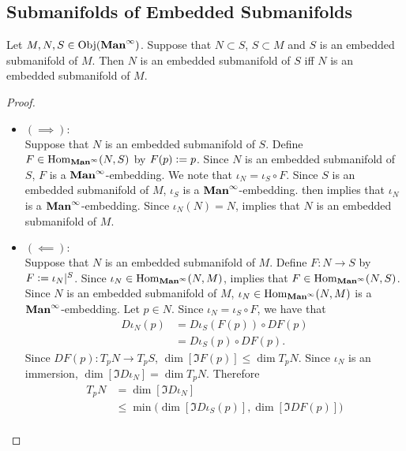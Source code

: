 \documentclass{book}
\begin{document}
	
	
	
	\subsection{Submanifolds of Embedded Submanifolds}
	
	\begin{ex} 
		Let $M, N, S \in \operatorname{Obj}(\operatorname*{\text{\textbf{Man}}^{\infty}})$. Suppose that $N \subset S$, $S \subset M$ and $S$ is an embedded submanifold of $M$. Then $N$ is an embedded submanifold of $S$ iff $N$ is an embedded submanifold of $M$.
	\end{ex}
	
	\begin{proof}\
		\begin{itemize}
			\item $(\implies):$ \\
			Suppose that $N$ is an embedded submanifold of $S$. Define $F \in \operatorname{Hom}_{\operatorname*{\text{\textbf{Man}}^{\infty}}}(N, S)$ by $F(p) \vcentcolon= p$. Since $N$ is an embedded submanifold of $S$, $F$ is a $\operatorname*{\text{\textbf{Man}}^{\infty}}$-embedding. We note that $\iota_N = \iota_S \circ F$. Since $S$ is an embedded submanifold of $M$, $\iota_S$ is a $\operatorname*{\text{\textbf{Man}}^{\infty}}$-embedding. \rex{}  then implies that $\iota_N$ is a $\operatorname*{\text{\textbf{Man}}^{\infty}}$-embedding. Since $\iota_N(N) = N$,  implies that $N$ is an embedded submanifold of $M$.
			\item $(\impliedby):$ \\
			Suppose that $N$ is an embedded submanifold of $M$. Define $F:N \rightarrow S$ by $F \vcentcolon= \iota_N|^S$. Since $\iota_N \in \operatorname{Hom}_{\operatorname*{\text{\textbf{Man}}^{\infty}}}(N, M)$,  implies that $F \in \operatorname{Hom}_{\operatorname*{\text{\textbf{Man}}^{\infty}}}(N, S)$. Since $N$ is an embedded submanifold of $M$, $\iota_N \in \operatorname{Hom}_{\operatorname*{\text{\textbf{Man}}^{\infty}}}(N, M)$ is a $\operatorname*{\text{\textbf{Man}}^{\infty}}$-embedding. Let $p \in N$. Since $\iota_N = \iota_S \circ F$, we have that 
			\begin{align*}
				D\iota_N(p) 
				& = D \iota_S (F(p)) \circ D F(p) \\
				& = D \iota_S(p) \circ DF(p).
			\end{align*} 
			Since $DF(p):T_pN \rightarrow T_pS$, $\dim [\Im F(p)] \leq \dim T_pN$. Since $\iota_N$ is an immersion, $\dim [\Im D \iota_N] = \dim T_pN$. Therefore
			\begin{align*}
				T_pN 
				& = \dim [\Im D \iota_N] \\
				& \leq \min \bigg( \dim [\Im D\iota_S(p)], \dim [\Im DF(p)] \bigg) \\

\end{align*}
\end{itemize}
\end{proof}
\end{document}
